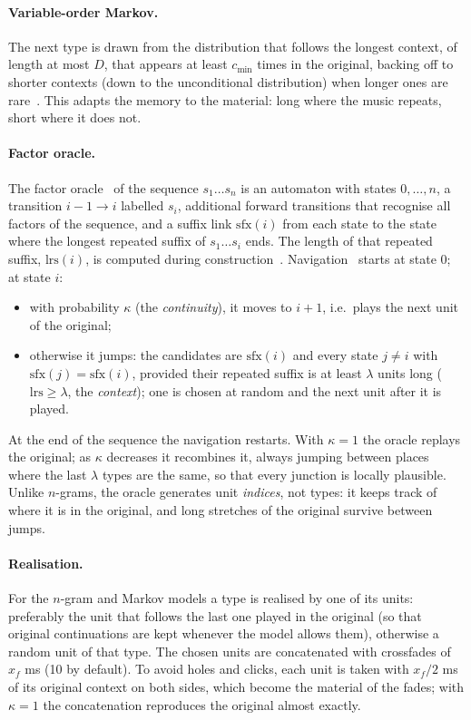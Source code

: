 \documentclass[11pt,a4paper]{article}
\begin{document}
\paragraph{Variable-order Markov.} The next type is drawn from the
distribution that follows the longest context, of length at most $D$, that
appears at least $c_{\min}$ times in the original, backing off to shorter
contexts (down to the unconditional distribution) when longer ones are
rare~\cite{ron1996,begleiter2004}. This adapts the memory to the material:
long where the music repeats, short where it does not.

\paragraph{Factor oracle.} The factor oracle~\cite{allauzen1999} of the
sequence $s_1 \dots s_n$ is an automaton with states $0, \dots, n$, a
transition $i-1 \to i$ labelled $s_i$, additional forward transitions that
recognise all factors of the sequence, and a suffix link $\mathrm{sfx}(i)$
from each state to the state where the longest repeated suffix of
$s_1 \dots s_i$ ends. The length of that repeated suffix,
$\mathrm{lrs}(i)$, is computed during construction~\cite{lefebvre2000}.
Navigation~\cite{assayag2004,wang2014} starts at state 0; at state $i$:
\begin{itemize}[leftmargin=*]
  \item with probability $\kappa$ (the \emph{continuity}), it moves to $i+1$,
    i.e.\ plays the next unit of the original;
  \item otherwise it jumps: the candidates are $\mathrm{sfx}(i)$ and every
    state $j \ne i$ with $\mathrm{sfx}(j) = \mathrm{sfx}(i)$, provided their
    repeated suffix is at least $\lambda$ units long
    ($\mathrm{lrs} \ge \lambda$, the \emph{context}); one is chosen at random
    and the next unit after it is played.
\end{itemize}
At the end of the sequence the navigation restarts. With $\kappa = 1$ the
oracle replays the original; as $\kappa$ decreases it recombines it, always
jumping between places where the last $\lambda$ types are the same, so that
every junction is locally plausible. Unlike $n$-grams, the oracle generates
unit \emph{indices}, not types: it keeps track of where it is in the
original, and long stretches of the original survive between jumps.

\paragraph{Realisation.} For the $n$-gram and Markov models a type is
realised by one of its units: preferably the unit that follows the last one
played in the original (so that original continuations are kept whenever the
model allows them), otherwise a random unit of that type. The chosen units
are concatenated with crossfades of $x_f$ ms (10 by default). To avoid holes
and clicks, each unit is taken with $x_f/2$ ms of its original context on
both sides, which become the material of the fades; with $\kappa = 1$ the
concatenation reproduces the original almost exactly.
\end{document}
